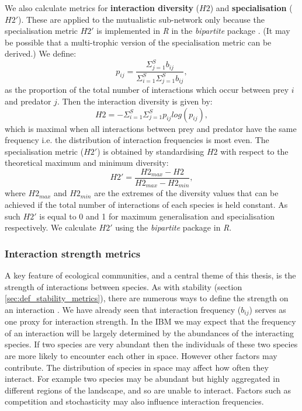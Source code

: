 We also calculate metrics for \textbf{interaction diversity} ($H2$) and \textbf{specialisation} ($H2'$). These are applied to the mutualistic sub-network only because the specialisation metric $H2'$ is implemented in \emph{R} in the \emph{bipartite} package \cite{dormann2008introducing}. (It may be possible that a multi-trophic version of the specialisation metric can be derived.) We define:
\begin{equation}
p_{ij} = \frac{\Sigma_{j=1}^S b_{ij}}{ \Sigma_{i=1}^S \Sigma_{j=1}^S b_{ij}},
\end{equation} 
%
as the proportion of the total number of interactions which occur between prey $i$ and predator $j$. Then the interaction diversity is given by:
\begin{equation}
H2 = - \Sigma_{i=1}^S \Sigma_{j=1}^S p_{ij} log(p_{ij}),
\label{eq:h2}
\end{equation}
%
which is maximal when all interactions between prey and predator have the same frequency i.e. the distribution of interaction frequencies is most even. The specialisation metric ($H2'$) is obtained by standardising $H2$ with respect to the theoretical maximum and minimum diversity:
\begin{equation}
H2' = \frac{H2_{max} - H2}{H2_{max} - H2_{min}},
\label{eq:h2_prime}
\end{equation}
% 
where $H2_{max}$ and $H2_{min}$ are the extremes of the diversity values that can be achieved if the total number of interactions of each species is held constant. As such $H2'$ is equal to 0 and 1 for maximum generalisation and specialisation respectively. We calculate $H2'$ using the \emph{bipartite} package in \emph{R}.


\subsubsection{Interaction strength metrics}
\label{sec:def_iss}
A key feature of ecological communities, and a central theme of this thesis, is the strength of interactions between species. As with stability (section \ref{sec:def_stability_metrics}), there are numerous ways to define the strength on an interaction \cite{berlow2004interaction}. We have already seen that interaction frequency ($b_{ij}$) serves as one proxy for interaction strength. In the IBM we may expect that the frequency of an interaction will be largely determined by the abundances of the interacting species. If two species are very abundant then the individuals of these two species are more likely to encounter each other in space. However other factors may contribute. The distribution of species in space may affect how often they interact. For example two species may be abundant but highly aggregated in different regions of the landscape, and so are unable to interact. Factors such as competition and stochasticity may also influence interaction frequencies.   

